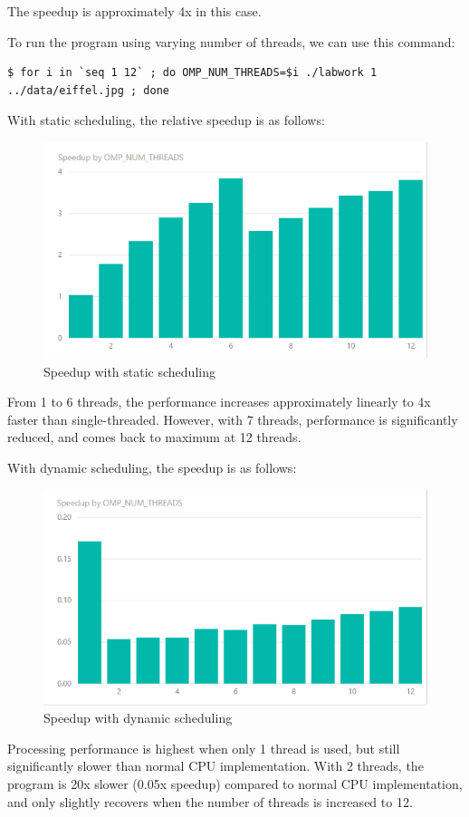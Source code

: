 \documentclass[12pt]{article}
\begin{document}
The speedup is approximately 4x in this case.

To run the program using varying number of threads, we can use this command:

\begin{lstlisting}[breaklines]
$ for i in `seq 1 12` ; do OMP_NUM_THREADS=$i ./labwork 1 ../data/eiffel.jpg ; done
\end{lstlisting}

With static scheduling, the relative speedup is as follows:

\begin{figure}[h]
    \caption{Speedup with static scheduling}
    \includegraphics{pics/static.png}
\end{figure}

From 1 to 6 threads, the performance increases approximately linearly to 4x faster than single-threaded. However, with 7 threads,
performance is significantly reduced, and comes back to maximum at 12 threads.

With dynamic scheduling, the speedup is as follows:

\begin{figure}[h]
    \caption{Speedup with dynamic scheduling}
    \includegraphics{pics/dynamic.png}
\end{figure}

Processing performance is highest when only 1 thread is used, but still significantly slower than normal CPU implementation.
With 2 threads, the program is 20x slower (0.05x speedup) compared to normal CPU implementation, and only slightly recovers
when the number of threads is increased to 12.

\end{document}
